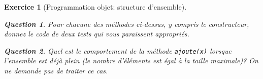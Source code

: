 \documentclass{article}
\theoremstyle{exostyle}
\newtheorem{exo}{Exercice}
\theoremstyle{partiestyle}
\theoremstyle{questionstyle}
\newtheorem{question}{Question}[exo]
\begin{document}
\begin{exo}[Programmation objet: structure d'ensemble\label{ensemble}]
\begin{question}
Pour chacune des méthodes ci-dessus, y compris le constructeur, donnez le code de deux tests qui vous paraissent appropriés.
\end{question}


\begin{question}
Quel est le comportement de la méthode \verb+ajoute(x)+ lorsque l'ensemble est déjà plein (le nombre d'éléments est égal à la taille maximale)? On ne demande pas de traiter ce cas.
\end{question}

\end{exo}
\clearpage
\end{document}

